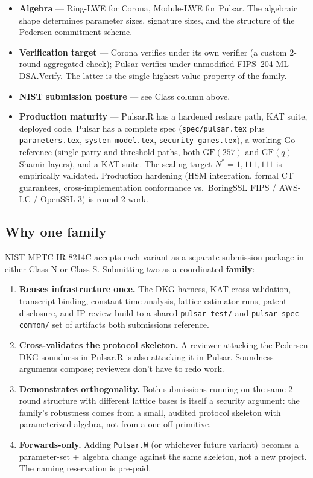 \begin{itemize}[leftmargin=*, itemsep=0pt]
\item \textbf{Algebra} --- Ring-LWE for Corona, Module-LWE for
Pulsar. The algebraic shape determines parameter sizes, signature
sizes, and the structure of the Pedersen commitment scheme.
\item \textbf{Verification target} --- Corona verifies under its own
verifier (a custom 2-round-aggregated check); Pulsar verifies under
unmodified FIPS~204 ML-DSA.Verify. The latter is the single
highest-value property of the family.
\item \textbf{NIST submission posture} --- see Class column above.
\item \textbf{Production maturity} --- Pulsar.R has a hardened
reshare path, KAT suite, deployed code. Pulsar has a complete spec
(\texttt{spec/pulsar.tex} plus \texttt{parameters.tex},
\texttt{system-model.tex}, \texttt{security-games.tex}), a working
Go reference (single-party and threshold paths, both
$\mathrm{GF}(257)$ and $\mathrm{GF}(q)$ Shamir layers), and a KAT
suite. The scaling target $N^* = 1{,}111{,}111$ is empirically
validated. Production hardening (HSM integration, formal CT
guarantees, cross-implementation conformance vs.\ BoringSSL FIPS /
AWS-LC / OpenSSL 3) is round-2 work.
\end{itemize}

\subsection{Why one family}

NIST MPTC IR 8214C accepts each variant as a separate submission
package in either Class N or Class S. Submitting two as a
coordinated \textbf{family}:

\begin{enumerate}[leftmargin=*, itemsep=0pt]
\item \textbf{Reuses infrastructure once.} The DKG harness, KAT
cross-validation, transcript binding, constant-time analysis,
lattice-estimator runs, patent disclosure, and IP review build to a
shared \texttt{pulsar-test/} and \texttt{pulsar-spec-common/} set of
artifacts both submissions reference.
\item \textbf{Cross-validates the protocol skeleton.} A reviewer
attacking the Pedersen DKG soundness in Pulsar.R is also attacking
it in Pulsar. Soundness arguments compose; reviewers don't have to
redo work.
\item \textbf{Demonstrates orthogonality.} Both submissions running
on the same 2-round structure with different lattice bases is itself
a security argument: the family's robustness comes from a small,
audited protocol skeleton with parameterized algebra, not from a
one-off primitive.
\item \textbf{Forwards-only.} Adding \texttt{Pulsar.W} (or whichever
future variant) becomes a parameter-set + algebra change against the
same skeleton, not a new project. The naming reservation is
pre-paid.
\end{enumerate}

